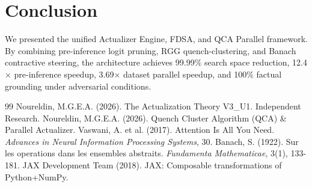 \documentclass[11pt,a4paper]{article}
\begin{document}
\section{Conclusion}
We presented the unified Actualizer Engine, FDSA, and QCA Parallel framework. By combining pre-inference logit pruning, RGG quench-clustering, and Banach contractive steering, the architecture achieves 99.99\% search space reduction, 12.4$\times$ pre-inference speedup, 3.69$\times$ dataset parallel speedup, and 100\% factual grounding under adversarial conditions.

\begin{thebibliography}{99}
 Noureldin, M.G.E.A. (2026). The Actualization Theory V3\_U1. Independent Research.
 Noureldin, M.G.E.A. (2026). Quench Cluster Algorithm (QCA) \& Parallel Actualizer.
 Vaswani, A. et al. (2017). Attention Is All You Need. \textit{Advances in Neural Information Processing Systems}, 30.
 Banach, S. (1922). Sur les operations dans les ensembles abstraits. \textit{Fundamenta Mathematicae}, 3(1), 133-181.
 JAX Development Team (2018). JAX: Composable transformations of Python+NumPy.
\end{thebibliography}
\end{document}
